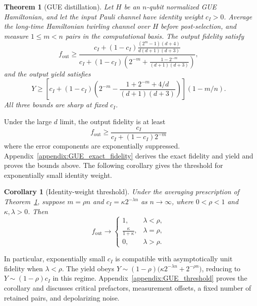 \documentclass[onecolumn,prx,longbibliography,nofootinbib, superscriptaddress]{revtex4-2}
\newtheorem{theorem}{Theorem}
\newtheorem{corollary}{Corollary}
\theoremstyle{recap}
\begin{document}
\begin{theorem}[GUE distillation]\label{thm:Haar}
    Let $H$ be an $n$-qubit normalized GUE Hamiltonian, and let the input Pauli channel have identity weight $c_I>0$. Average the long-time Hamiltonian twirling channel over $H$ before post-selection, and measure $1\leq m<n$ pairs in the computational basis. The output fidelity satisfy
    \begin{equation}\label{eq:GUE_sharp_fidelity_bound}
        f_{\mathrm{out}}\geq
        \frac{c_I+(1-c_I)\frac{(2^m-1)(d+4)}{d(d+1)(d+3)}}{c_I+(1-c_I)\left(2^{-m}+\frac{1-2^{-m}}{(d+1)(d+3)}\right)},
    \end{equation}
    and the output yield satisfies
    \begin{equation}\label{eq:GUE_yield_bounds}
        Y\geq \left[c_I+(1-c_I)\left(2^{-m}-\frac{1+2^{-m}+4/d}{(d+1)(d+3)}\right)\right](1-m/n).
    \end{equation}
    All three bounds are sharp at fixed $c_I$.
\end{theorem}

Under the large $d$ limit, the output fidelity is at least
\begin{equation}
    f_{\mathrm{out}}\geq\frac{c_{I}}{c_{I}+(1-c_{I})2^{-m}}
\end{equation}
where the error components are exponentially suppressed. Appendix~\ref{appendix:GUE_exact_fidelity} derives the exact fidelity and yield and proves the bounds above. The following corollary gives the threshold for exponentially small identity weight.

\begin{corollary}[Identity-weight threshold]\label{cor:GUE_threshold}
    Under the averaging prescription of Theorem~\ref{thm:Haar}, suppose $m=\rho n$ and $c_I=\kappa2^{-\lambda n}$ as $n\to\infty$, where $0<\rho<1$ and $\kappa,\lambda>0$. Then
    \begin{equation}\label{eq:GUE_threshold_corollary}
        f_{\mathrm{out}}\longrightarrow
        \begin{cases}
            1,&\lambda<\rho,\\
            \displaystyle\frac{\kappa}{1+\kappa},&\lambda=\rho,\\
            0,&\lambda>\rho.
        \end{cases}
    \end{equation}
\end{corollary}

In particular, exponentially small $c_I$ is compatible with asymptotically unit fidelity when $\lambda<\rho$. The yield obeys $Y\sim(1-\rho)\bigl(\kappa2^{-\lambda n}+2^{-\rho n}\bigr)$, reducing to $Y\sim(1-\rho)c_I$ in this regime. Appendix~\ref{appendix:GUE_threshold} proves the corollary and discusses critical prefactors, measurement offsets, a fixed number of retained pairs, and depolarizing noise.
\end{document}
